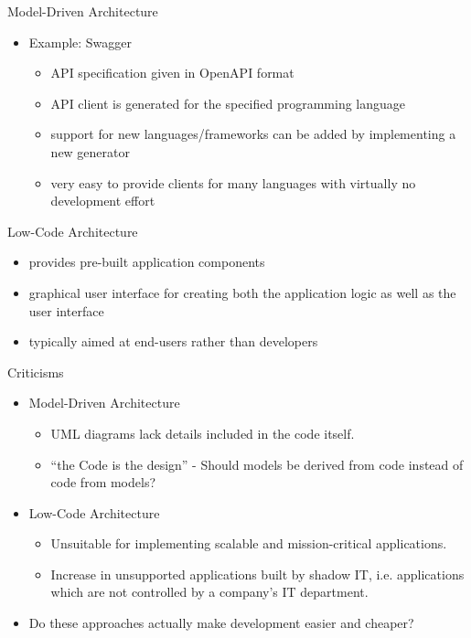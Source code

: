 \documentclass[aspectratio=169]{beamer}
\begin{document}
  \begin{frame}{Model-Driven Architecture}
    \begin{itemize}
      \item Example: Swagger
        \begin{itemize}
          \item API specification given in OpenAPI format
          \item API client is generated for the specified programming language
          \item support for new languages/frameworks can be added by implementing a new generator
          \item very easy to provide clients for many languages with virtually no development effort
        \end{itemize}
    \end{itemize}
  \end{frame}

  \begin{frame}{Low-Code Architecture}
    \begin{itemize}
      \item provides pre-built application components
      \item graphical user interface for creating both the
            application logic as well as the user interface
      \item typically aimed at end-users rather than developers
    \end{itemize}
  \end{frame}

  \begin{frame}{Criticisms}
    \begin{itemize}
      \item Model-Driven Architecture
        \begin{itemize}
          \item UML diagrams lack details included in the code itself.
          \item “the Code is the design” - Should models be derived from code instead of code from models?
        \end{itemize}
      \item Low-Code Architecture
        \begin{itemize}
          \item Unsuitable for implementing scalable and mission-critical applications.
          \item Increase in unsupported applications built by shadow IT,
                i.e. applications which are not controlled by a company's IT department.
        \end{itemize}
      \item Do these approaches actually make development easier and cheaper?
    \end{itemize}
  \end{frame}
\end{document}
